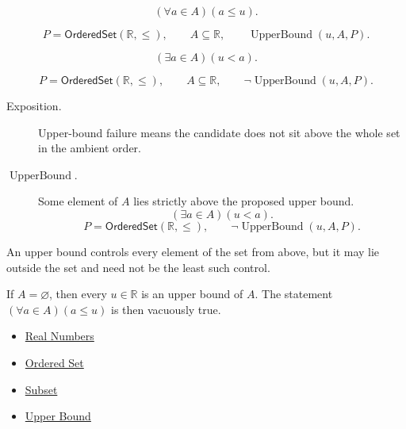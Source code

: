 \begin{remark*}
\[
  (\forall a\in A)(a\leq u).
\]
\end{remark*}

\begin{remark*}
\[
  P=\mathsf{OrderedSet}(\mathbb{R},\leq),\qquad A\subseteq\mathbb{R},\qquad
  \operatorname{UpperBound}(u,A,P).
\]
\end{remark*}

\begin{remark*}
\[
  (\exists a\in A)(u<a).
\]
\end{remark*}

\begin{remark*}
\[
  P=\mathsf{OrderedSet}(\mathbb{R},\leq),\qquad A\subseteq\mathbb{R},\qquad
  \neg\operatorname{UpperBound}(u,A,P).
\]
\end{remark*}

\begin{remark*}
\begin{description}
  \item[Exposition.]
  Upper-bound failure means the candidate does not sit above the whole
  set in the ambient order.

  \item[\(\operatorname{UpperBound}.\)]
  Some element of $A$ lies strictly above the proposed upper bound.
  \[
    (\exists a\in A)(u<a).
  \]
  \[
    P=\mathsf{OrderedSet}(\mathbb{R},\leq),\qquad
    \neg\operatorname{UpperBound}(u,A,P).
  \]
\end{description}
\end{remark*}

\begin{remark*}[Interpretation]
An upper bound controls every element of the set from above, but it may
lie outside the set and need not be the least such control.
\end{remark*}

\begin{remark*}[Exposition]
If $A=\varnothing$, then every $u\in\mathbb{R}$ is an upper bound of $A$.
The statement $(\forall a\in A)(a\leq u)$ is then vacuously true.
\end{remark*}

\begin{dependencies}
\begin{itemize}
  \item \hyperref[def:reals]{Real Numbers}
  \item \hyperref[def:ordered-set]{Ordered Set}
  \item \hyperref[def:subset]{Subset}
  \item \hyperref[def:upper-bound]{Upper Bound}
\end{itemize}
\end{dependencies}


